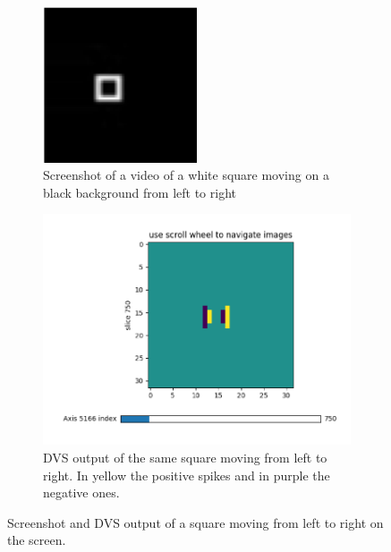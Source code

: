 \begin{figure}[ht]
\centering
\begin{subfigure}{0.45\textwidth}
\centering
\includegraphics[width=0.5\textwidth]{images/development/dvs_square_lr.png} 
\caption{Screenshot of a video of a white square moving on a black background from left to right}
\label{fig:dvs_square_lr}
\end{subfigure}
\begin{subfigure}{0.45\textwidth}
\centering
\includegraphics[width=\textwidth]{images/development/spikes_square_lr.png}
\caption{DVS output of the same square moving from left to right. In yellow the positive spikes and in purple the negative ones.}
\label{fig:spikes_square_lr}
\end{subfigure}
\caption[DVS Output of a Square]{Screenshot and DVS output of a square moving from left to right on the screen.}
\label{fig:square_lr}
\end{figure}

